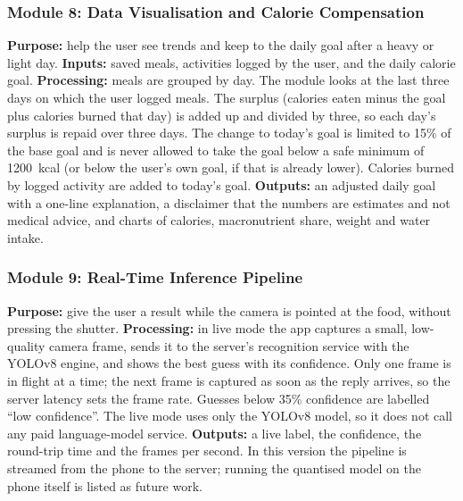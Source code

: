 \subsubsection{Module 8: Data Visualisation and Calorie Compensation}
\textbf{Purpose:} help the user see trends and keep to the daily goal after a
heavy or light day. \textbf{Inputs:} saved meals, activities logged by the user,
and the daily calorie goal. \textbf{Processing:} meals are grouped by day. The
module looks at the last three days on which the user logged meals. The surplus
(calories eaten minus the goal plus calories burned that day) is added up and
divided by three, so each day's surplus is repaid over three days. The change to
today's goal is limited to 15\% of the base goal and is never allowed to take the
goal below a safe minimum of 1200~kcal (or below the user's own goal, if that is
already lower). Calories burned by logged activity are added to today's goal.
\textbf{Outputs:} an adjusted daily goal with a one-line explanation, a disclaimer
that the numbers are estimates and not medical advice, and charts of calories,
macronutrient share, weight and water intake.


\subsubsection{Module 9: Real-Time Inference Pipeline}
\textbf{Purpose:} give the user a result while the camera is pointed at the food,
without pressing the shutter. \textbf{Processing:} in live mode the app captures a
small, low-quality camera frame, sends it to the server's recognition service
with the YOLOv8 engine, and shows the best guess with its confidence. Only one
frame is in flight at a time; the next frame is captured as soon as the reply
arrives, so the server latency sets the frame rate. Guesses below 35\% confidence
are labelled ``low confidence''. The live mode uses only the YOLOv8 model, so it
does not call any paid language-model service. \textbf{Outputs:} a live label,
the confidence, the round-trip time and the frames per second.
In this version the pipeline is streamed from the phone to the server; running
the quantised model on the phone itself is listed as future work.


